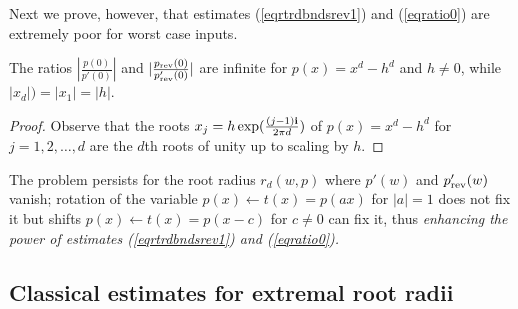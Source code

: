 \documentclass[runningheads]{llncs}
\begin{document}
 Next we prove, however,  that estimates (\ref{eqrtrdbndsrev1}) and (\ref{eqratio0}) are extremely poor for  worst case inputs.
\begin{theorem}\label{thrtr}
The ratios $|\frac{p(0)}{p'(0)}|$ 
and $|\frac{p_{\rm rev}(0)}{p_{\rm rev}'(0)}|$ are infinite for  $p(x)=x^d-h^d$ and $h\neq 0$, while  $|x_d|)=|x_1|=|h|$.
 \end{theorem}
 \begin{proof}
 Observe that 
 the roots $x_j=h\exp(\frac{(j-1){\bf i}}{2\pi d})$ of $p(x)=x^d-h^d$
  for $j=1,2,\dots,d$   are the $d$th roots  of unity up to scaling by $h$.
 \end{proof}

The problem persists for the root radius $r_d(w,p)$  where  $p'(w)$ and  $p'_{\rm rev}(w)$ vanish;  
 rotation of the variable  $p(x)\leftarrow t(x)=p(ax)$
for $|a|=1$ does not  fix it but  shifts $p(x)\leftarrow t(x)=p(x-c)$
for $c\neq 0$ can fix it, thus {\em enhancing the power of  estimates (\ref{eqrtrdbndsrev1}) and (\ref{eqratio0}).} 

\subsection{Classical estimates for extremal root radii}\label{subsec:class_est}
\end{document}
